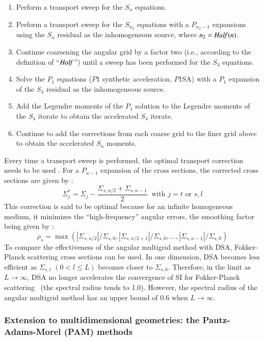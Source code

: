 \documentclass[preprint,10pt]{elsarticle}
\renewcommand{\(}{\left(}
\renewcommand{\)}{\right)}
\renewcommand{\[}{\left[}
\renewcommand{\]}{\right]}
\newcommand{\Half}{\text{\it Half\,}}
\begin{document}
\begin{enumerate}
\item Perform a transport sweep for the $S_n$ equations.
\item Perform a transport sweep for the $S_{n_2}$ equations with a $P_{n_2-1}$
expansions using the $S_n$ residual as the inhomogeneous source, where
$n_2=\Half(n)$.
\item Continue coarsening the angular grid by a factor two (i.e., according to
the definition of ``$\Half$'') until a sweep has been performed for the $S_4$
equations.
\item Solve the $P_1$ equations ($P$1 synthetic acceleration, $P$1SA) with a $P_1$ expansion of the $S_4$
residual as the inhomogeneous source.
\item Add the Legendre moments of the $P_1$ solution to the Legendre
moments of the $S_4$ iterate to obtain the accelerated $S_4$ iterate.
\item Continue to add the corrections from each coarse grid to the finer grid
above to obtain the accelerated $S_n$ moments.
\end{enumerate}
%
Every time a transport sweep is performed, the optimal transport correction
needs to be used \cite{multigrid_1d}. For a $P_{n-1}$ expansion of the cross
sections, the corrected cross sections are given by :
%
\begin{equation}
\Sigma_{j}^* = \Sigma_{j} -\frac{\Sigma_{s,n/2}+\Sigma_{s,n-1}}{2}\ 
\textrm{ with }j=t \textrm{ or }s,l
\end{equation}
%
This correction is said to be optimal because for an infinite homogeneous medium, 
it minimizes the ``high-frequency'' angular errors, the smoothing factor being 
given by :
%
\begin{equation}
\rho_s =
\max\(|\Sigma_{s,n/2}|/\Sigma_{s,0},|\Sigma_{s,n/2+1}|/\Sigma_{s,0},\hdots,
|\Sigma_{s,n-1}|/\Sigma_{s,0}\)
\end{equation}
%
To compare the effectiveness of the angular multigrid method with DSA, 
Fokker-Planck scattering cross sections can be used. In one dimension,
DSA becomes less efficient as $\Sigma_{s,l}$ $(0<l\le L)$ becomes closer to
$\Sigma_{s,0}$. Therefore, in the limit as $L\rightarrow \infty$, DSA no
longer accelerates the convergence of SI for Fokker-Planck scattering \
(the spectral radius tends to 1.0). However, the spectral radius of the
angular multigrid method has an upper bound of 0.6 when $L\rightarrow \infty$.


\subsubsection{Extension to multidimensional geometries: the Pautz-Adams-Morel (PAM) methods}
\end{document}

